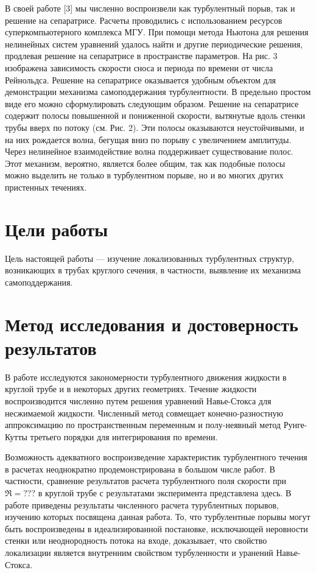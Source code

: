 В своей работе [3] мы численно воспроизвели как турбулентный порыв, так и решение на сепаратрисе. Расчеты проводились с использованием ресурсов суперкомпьютерного комплекса МГУ. При помощи метода Ньютона для решения нелинейных систем уравнений удалось найти и другие периодические решения, продлевая решение на сепаратрисе в пространстве параметров. На рис. 3 изображена зависимость скорости сноса и периода по времени от числа Рейнольдса. Решение на сепаратрисе оказывается удобным объектом для демонстрации механизма самоподдержания турбулентности. В предельно простом виде его можно сформулировать следующим образом. Решение на сепаратрисе содержит полосы повышенной и пониженной скорости, вытянутые вдоль стенки трубы вверх по потоку (см. Рис. 2). Эти полосы оказываются неустойчивыми, и на них рождается волна, бегущая вниз по порыву с увеличением амплитуды. Через нелинейное взаимодействие волна поддерживает существование полос. Этот механизм, вероятно, является более общим, так как подобные полосы можно выделить не только в турбулентном порыве, но и во многих других пристенных течениях.


\section{Цели работы}

Цель настоящей работы --- изучение локализованных турбулентных структур, возникающих в трубах круглого сечения, в частности, выявление их механизма самоподдержания. 

\section{Метод исследования и достоверность результатов}

В работе исследуются закономерности турбулентного движения жидкости в круглой трубе и в некоторых других геометриях. Течение жидкости воспроизводится численно путем решения уравнений Навье-Стокса для несжимаемой жидкости. Численный метод совмещает конечно-разностную аппроксимацию по пространственным переменным и полу-неявный метод Рунге-Кутты третьего порядки для интегрирования по времени. 

Возможность адекватного воспроизведение характеристик турбулентного течения в расчетах неоднократно продемонстрирована в большом числе работ. В частности, сравнение результатов расчета турбулентного поля скорости при $\Re = ???$ в круглой трубе с результатами эксперимента представлена здесь. В работе приведены результаты численного расчета турублентных порывов, изучению которых посвящена данная работа. То, что турбулентные порывы могут быть воспроизведены в идеализированной постановке, исключающей неровности стенки или неоднородность потока на входе, доказывает, что свойство локализации является внутренним свойством турбуленности и уранений  Навье-Стокса. 


